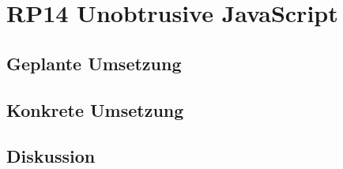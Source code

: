 \section{RP14 Unobtrusive JavaScript}
\label{sec:principle-rp14-unobtrusive-javascript}

\subsection*{Geplante Umsetzung}


\subsection*{Konkrete Umsetzung}


\subsection*{Diskussion}
